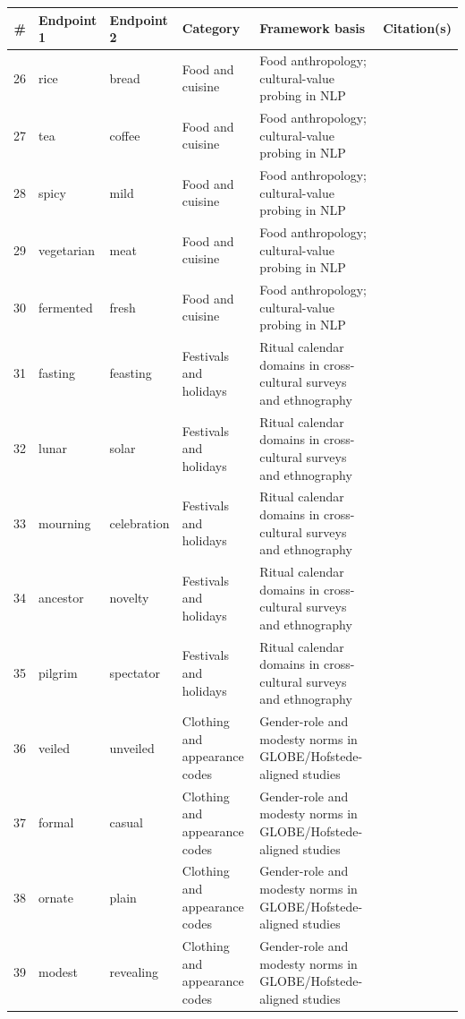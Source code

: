 \begin{tabular}{@{}rlllll@{}}
\toprule
\# & Endpoint 1 & Endpoint 2 & Category & Framework basis & Citation(s) \\
\midrule
26 & rice & bread & Food and cuisine & Food anthropology; cultural-value probing in NLP & \cite{hershcovich2022challenges} \\
27 & tea & coffee & Food and cuisine & Food anthropology; cultural-value probing in NLP & \cite{hershcovich2022challenges} \\
28 & spicy & mild & Food and cuisine & Food anthropology; cultural-value probing in NLP & \cite{hershcovich2022challenges} \\
29 & vegetarian & meat & Food and cuisine & Food anthropology; cultural-value probing in NLP & \cite{arora2023probing} \\
30 & fermented & fresh & Food and cuisine & Food anthropology; cultural-value probing in NLP & \cite{hershcovich2022challenges} \\
31 & fasting & feasting & Festivals and holidays & Ritual calendar domains in cross-cultural surveys and ethnography & \cite{inglehart2005modernization} \\
32 & lunar & solar & Festivals and holidays & Ritual calendar domains in cross-cultural surveys and ethnography & \cite{hershcovich2022challenges} \\
33 & mourning & celebration & Festivals and holidays & Ritual calendar domains in cross-cultural surveys and ethnography & \cite{inglehart2005modernization} \\
34 & ancestor & novelty & Festivals and holidays & Ritual calendar domains in cross-cultural surveys and ethnography & \cite{schwartz2006theory} \\
35 & pilgrim & spectator & Festivals and holidays & Ritual calendar domains in cross-cultural surveys and ethnography & \cite{arora2023probing} \\
36 & veiled & unveiled & Clothing and appearance codes & Gender-role and modesty norms in GLOBE/Hofstede-aligned studies & \cite{house2004culture} \\
37 & formal & casual & Clothing and appearance codes & Gender-role and modesty norms in GLOBE/Hofstede-aligned studies & \cite{hofstede2001culture} \\
38 & ornate & plain & Clothing and appearance codes & Gender-role and modesty norms in GLOBE/Hofstede-aligned studies & \cite{hershcovich2022challenges} \\
39 & modest & revealing & Clothing and appearance codes & Gender-role and modesty norms in GLOBE/Hofstede-aligned studies & \cite{house2004culture} \\

\end{tabular}
